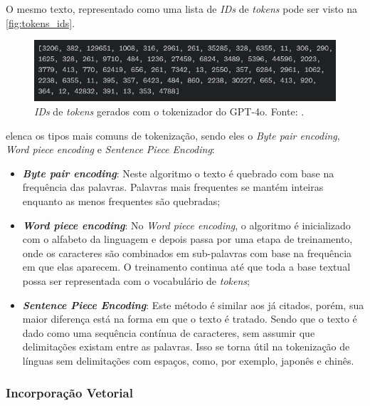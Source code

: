 O mesmo texto, representado como uma lista de \textit{IDs} de \textit{tokens} pode ser visto na \autoref{fig:tokens_ids}.

\begin{figure}[ht]
      \centering
      \includegraphics[width=0.7\columnwidth,keepaspectratio]{images/tokens_ids.png}
      \caption{\small \textit{IDs} de \textit{tokens} gerados com o tokenizador do \ac{GPT}-4o. Fonte: \textcite{tokenizer}.}
      \label{fig:tokens_ids}
\end{figure}

\textcite{llm_survey_2024} elenca os tipos mais comuns de tokenização, sendo eles o \textit{Byte pair encoding}, \textit{Word piece encoding} e
\textit{Sentence Piece Encoding}:

\begin{itemize}
      \item \textbf{\textit{Byte pair encoding}}: Neste algoritmo o texto é quebrado com base na frequência das palavras. Palavras mais frequentes se mantém inteiras
            enquanto as menos frequentes são quebradas;
      \item \textbf{\textit{Word piece encoding}}: No \textit{Word piece encoding}, o algoritmo é inicializado com o alfabeto da linguagem e depois passa por uma etapa
            de treinamento, onde os caracteres são combinados em sub-palavras com base na frequência em que elas aparecem. O treinamento continua até que toda a base
            textual possa ser representada com o vocabulário de \textit{tokens};
      \item \textbf{\textit{Sentence Piece Encoding}}: Este método é similar aos já citados, porém, sua maior diferença está na forma em que o texto é tratado. Sendo
            que o texto é dado como uma sequência contínua de caracteres, sem assumir que delimitações existam entre as palavras. Isso se torna útil na tokenização de
            línguas sem delimitações com espaços, como, por exemplo, japonês e chinês.
\end{itemize}

\subsubsection{Incorporação Vetorial}

